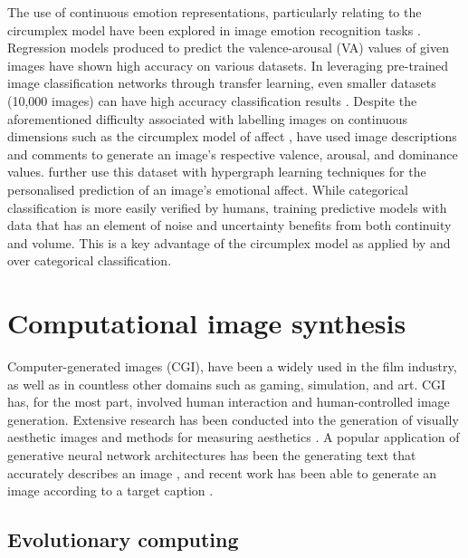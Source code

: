 \documentclass{article}
\begin{document}
The use of continuous emotion representations, particularly relating to the circumplex model have been explored in image emotion recognition tasks \citep{kim2018building, zhao2016predicting, zhao2017continuous}.
Regression models produced to predict the valence-arousal (VA) values of given images have shown high accuracy on various datasets.
In leveraging pre-trained image classification networks through transfer learning, even smaller datasets (10,000 images) can have high accuracy classification results \citep{kim2018building}.
Despite the aforementioned difficulty associated with labelling images on continuous dimensions such as the circumplex model of affect \citep{russell1980circumplex}, \citet{zhao2016predicting} have used image descriptions and comments to generate an image's respective valence, arousal, and dominance values.
\citet{zhao2016predicting} further use this dataset with hypergraph learning techniques for the personalised prediction of an image's emotional affect.
While categorical classification is more easily verified by humans, training predictive models with data that has an element of noise and uncertainty benefits from both continuity and volume.
This is a key advantage of the circumplex model as applied by \citet{kim2018building} and \citet{zhao2016predicting} over categorical classification.


\section{Computational image synthesis}

Computer-generated images (CGI), have been a widely used in the film industry, as well as in countless other domains such as gaming, simulation, and art.
CGI has, for the most part, involved human interaction and human-controlled image generation.
Extensive research has been conducted into the generation of visually aesthetic images and methods for measuring aesthetics \citep{den2010comparing,den2010using,den2011evolving,den2014investigating}.
A popular application of generative neural network architectures has been the generating text that accurately describes an image \citep{mathews2016senticap}, and recent work has been able to generate an image according to a target caption \citep{reed2016generative,zhang2017stackgan}.


\subsection{Evolutionary computing}
\end{document}
